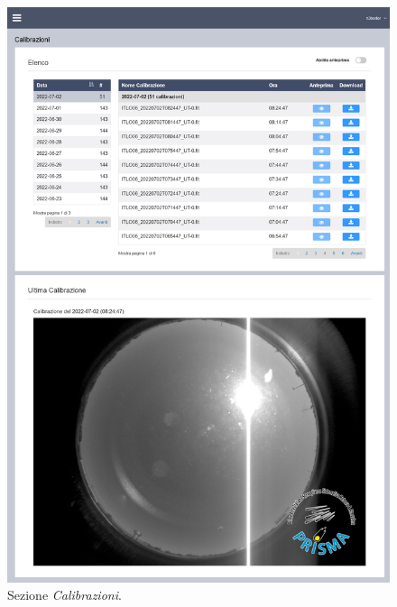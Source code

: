 \begin{figure}[H]
    \begin{center}
    \includegraphics[width=\textwidth]{images/full-captures.png}
    \caption{Sezione \emph{Calibrazioni}.}
    \label{fig:calibrazioni}
    \end{center}
\end{figure}

